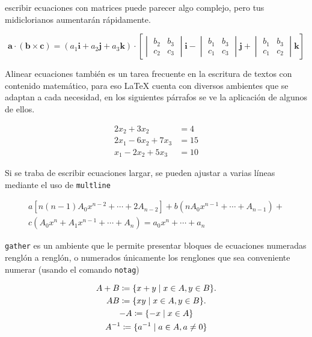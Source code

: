 \documentclass[10pt,a4paper]{article}
\newcommand{\comment}[1]{\textcolor{gray!75}{#1}}
\begin{document}
\comment{escribir ecuaciones con matrices puede parecer algo complejo, pero tus midiclorianos aumentarán rápidamente.}

\begin{equation}
\mathbf{a}\cdot (\mathbf{b}\times \mathbf{c}) = (a_1\mathbf{i} + a_2\mathbf{j} + a_3\mathbf{k})\cdot \left[ \begin{vmatrix} b_2 & b_3 \\ c_2 & c_3\end{vmatrix}\mathbf{i} - \begin{vmatrix} b_1 & b_3 \\ c_1 & c_3\end{vmatrix}\mathbf{j} + \begin{vmatrix} b_1 & b_3 \\ c_1 & c_2\end{vmatrix}\mathbf{k} \right]
\end{equation}

\comment{Alinear ecuaciones también es un tarea frecuente en la escritura de textos con contenido matemático, para eso \LaTeX{} cuenta con diversos ambientes que se adaptan a cada necesidad, en los siguientes párrafos se ve la aplicación de algunos de ellos.}

\begin{equation}
\begin{split}
2x_2 + 3x_2 &= 4 \\
2x_1 - 6x_2 + 7x_3 &= 15 \\
x_1 - 2x_2 + 5x_3 &= 10
\end{split}
\end{equation}

\comment{Si se traba de escribir ecuaciones largar, se pueden ajustar a varias líneas mediante el uso de \texttt{multline}}

\begin{multline*}
      a[n(n - 1)A_0x^{n-2} + \cdots +2A_{n-2}] + b(nA_0x^{n-1}+\cdots +A_{n-1}) + \\ c(A_0x^n + A_1x^{n-1}+\cdots +A_n) = a_0x^n + \cdots + a_n
\end{multline*}

\comment{\texttt{gather} es un ambiente que le permite presentar bloques de ecuaciones numeradas renglón a renglón, o numerados únicamente los renglones que sea conveniente numerar (usando el comando \texttt{notag})}

\begin{gather}
	A + B \coloneqq \{x + y \;|\; x \in A, y \in B\}. \\
    AB \coloneqq \{xy \;|\; x \in A, y \in B\}. \notag \\
    -A \coloneqq \{-x \;|\; x \in A\} \\
    A^{-1} \coloneqq \{a^{-1} \;|\; a \in A, a \neq 0\} \notag
\end{gather}
\end{document}
